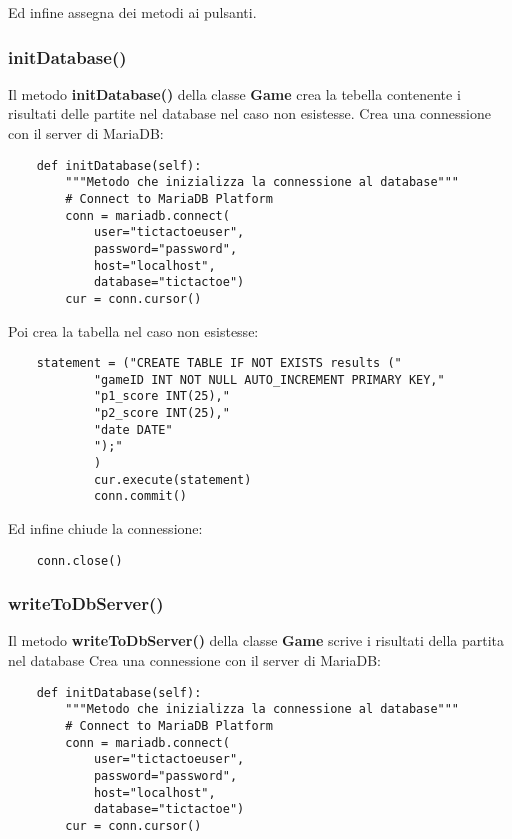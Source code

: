 \documentclass{article}
\begin{document}
Ed infine assegna dei metodi ai pulsanti.

\subsubsection{initDatabase()}
Il metodo \textbf{initDatabase()} della classe \textbf{Game} crea la tebella contenente i risultati delle partite
nel database nel caso non esistesse.
\newline\newline
Crea una connessione con il server di MariaDB:

\begin{verbatim}
    def initDatabase(self):
        """Metodo che inizializza la connessione al database"""
        # Connect to MariaDB Platform
        conn = mariadb.connect(
            user="tictactoeuser",
            password="password",
            host="localhost",
            database="tictactoe")
        cur = conn.cursor() 
\end{verbatim}
\newpage

Poi crea la tabella nel caso non esistesse:

\begin{verbatim}
    statement = ("CREATE TABLE IF NOT EXISTS results ("
            "gameID INT NOT NULL AUTO_INCREMENT PRIMARY KEY,"
            "p1_score INT(25),"
            "p2_score INT(25),"
            "date DATE"
            ");"
            )
            cur.execute(statement)
            conn.commit()
\end{verbatim}
Ed infine chiude la connessione:

\begin{verbatim}
    conn.close()
\end{verbatim}

\subsubsection{writeToDbServer()}
Il metodo \textbf{writeToDbServer()} della classe \textbf{Game} scrive i risultati della partita nel database
\newline\newline
Crea una connessione con il server di MariaDB:

\begin{verbatim}
    def initDatabase(self):
        """Metodo che inizializza la connessione al database"""
        # Connect to MariaDB Platform
        conn = mariadb.connect(
            user="tictactoeuser",
            password="password",
            host="localhost",
            database="tictactoe")
        cur = conn.cursor() 
\end{verbatim}
\end{document}
